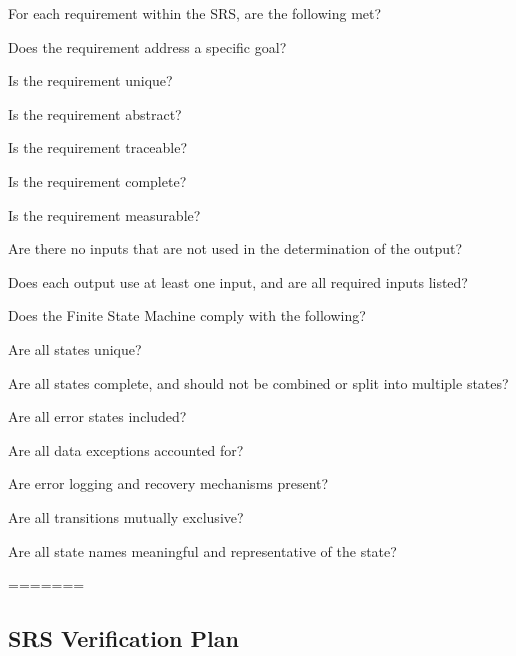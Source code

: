 \documentclass[12pt, titlepage]{article}
\begin{document}
\begin{todolist}
\label{SRS_Checklist}
\item For each requirement within the SRS, are the following met?
\begin{todolist}
    \item Does the requirement address a specific goal?
    \item Is the requirement unique? 
    \item Is the requirement abstract?
    \item Is the requirement traceable?
    \item Is the requirement complete?
    \item Is the requirement measurable?
    \item Are there no inputs that are not used in the determination of the output? 
    \item Does each output use at least one input, and are all required inputs listed?
\end{todolist}
\item Does the Finite State Machine comply with the following?
\begin{todolist}
    \item Are all states unique?
    \item Are all states complete, and should not be combined or split into multiple states?
    \item Are all error states included?
    \begin{todolist}
        \item Are all data exceptions accounted for?
        \item Are error logging and recovery mechanisms present?
    \end{todolist}
    \item Are all transitions mutually exclusive?
    \item Are all state names meaningful and representative of the state?
\end{todolist}
\end{todolist}
=======

\subsection{SRS Verification Plan}
\end{document}
